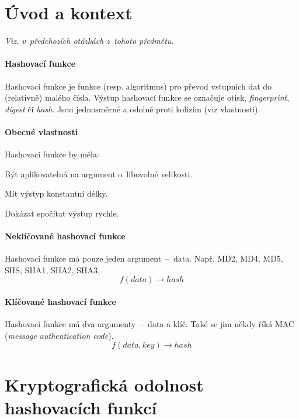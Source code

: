
\section{Úvod a kontext}

\textit{Viz.  v~předchozích otázkách z~tohoto předmětu.}

\paragraph*{Hashovací funkce} Hashovací funkce je funkce (resp. algoritmus) pro převod vstupních dat do (relativně) malého čísla. Výstup hashovací funkce se označuje otisk, \textit{fingerprint}, \textit{digest} či \textit{hash}. Jsou jednosměrné a odolné proti kolizím (viz vlastnosti).

\paragraph*{Obecné vlastnosti} Hashovací funkce by měla: \begin{compactitem}
    \item Být aplikovatelná na argument o~libovolné velikosti.
    \item Mít výstyp konstantní délky.
    \item Dokázat spočítat výstup rychle.
\end{compactitem}

\paragraph*{Neklíčované hashovací funkce} Hashovací funkce má pouze jeden argument~--~data. Např. MD2, MD4, MD5, SHS, SHA1, SHA2, SHA3. $$f(data) \rightarrow hash$$

\paragraph*{Klíčované hashovací funkce} Hashovací funkce má dva argumenty~--~data a klíč. Také se jim někdy říká MAC (\textit{message authentication code}). $$f(data, key) \rightarrow hash$$


\section{Kryptografická odolnost hashovacích funkcí}

